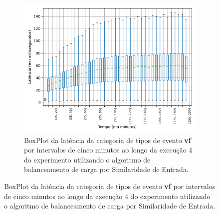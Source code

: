 

\begin{figure}
\centering
\begin{subfigure}{.5\textwidth}
\centering
\includegraphics[width=\textwidth]{figuras/graphics/boxplot_9-dez-is_vf.png}
\caption{BoxPlot da latência da categoria de tipos de evento \textbf{vf} por intervalos de cinco minutos ao longo da execução 4 do experimento utilizando o algoritmo de balanceamento de carga por Similaridade de Entrada.}
\label{fig:BoxPlot_vf_9-dez-is}
\end{subfigure}%


\end{figure}
